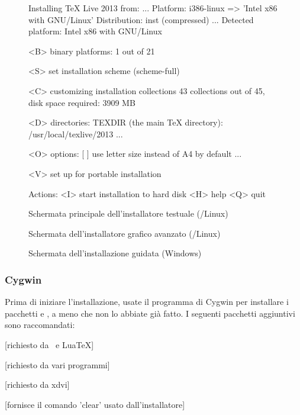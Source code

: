 \documentclass{article}
\begin{document}
\begin{figure}[tb]
\begin{boxedverbatim}
Installing TeX Live 2013 from: ...
Platform: i386-linux => 'Intel x86 with GNU/Linux'
Distribution: inst (compressed)
...
 Detected platform: Intel x86 with GNU/Linux

 <B> binary platforms: 1 out of 21

 <S> set installation scheme (scheme-full)

 <C> customizing installation collections
     43 collections out of 45, disk space required: 3909 MB

 <D> directories:
   TEXDIR (the main TeX directory):
     /usr/local/texlive/2013
   ...

 <O> options:
   [ ] use letter size instead of A4 by default
   ...

 <V> set up for portable installation

Actions:
 <I> start installation to hard disk
 <H> help
 <Q> quit
\end{boxedverbatim}
\caption{Schermata principale dell'installatore testuale
  (\GNU/Linux)}\label{fig:text-main}
\end{figure}

\begin{figure}[tb]
\caption{Schermata dell'installatore grafico avanzato
  (\GNU/Linux)}\label{fig:gui-main}
\end{figure}

\begin{figure}[tb]
\caption{Schermata dell'installazione guidata
  (Windows)}\label{fig:wizard-w32}
\end{figure}


\subsubsection{Cygwin}
\label{sec:cygwin}

Prima di iniziare l'installazione, usate il programma 
di Cygwin per installare i pacchetti  e , a
meno che non lo abbiate già fatto. I seguenti pacchetti aggiuntivi sono
raccomandati:
\begin{itemize*}
\item {} [richiesto da \XeTeX\ e Lua\TeX]
\item {} [richiesto da vari programmi]
\item {} [richiesto da xdvi]
\item {} [fornisce il comando 'clear' usato
  dall'installatore]
\end{itemize*}
\end{document}
